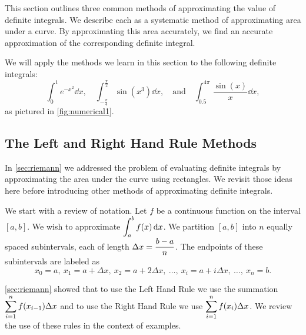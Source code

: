 This section outlines three common methods of approximating the value of definite integrals. We describe each as a systematic method of approximating area under a curve. By approximating this area accurately, we find an accurate approximation of the corresponding definite integral.

We will apply the methods we learn in this section to the following definite integrals:\vspace{-.5\baselineskip}
\[
 \int_0^1 e^{-x^2}\dd x, \quad
 \int_{-\frac{\pi}{4}}^{\frac{\pi}{2}} \sin(x^3)\dd x,
 \quad \text{and} \quad
 \int_{0.5}^{4\pi} \frac{\sin(x)}{x}\dd x,
\]
as pictured in \autoref{fig:numerical1}.

\subsection{The Left and Right Hand Rule Methods}

In \autoref{sec:riemann} we addressed the problem of evaluating definite integrals by approximating the area under the curve using rectangles. We revisit those ideas here before introducing other methods of approximating definite integrals. 

We start with a review of notation. Let $f$ be a continuous function on the interval $[a,b]$. We wish to approximate $\displaystyle \int_a^b f(x)\operatorname{d}\! x$. We partition $[a,b]$ into $n$ equally spaced subintervals, each of length $\displaystyle\Delta x = \frac{b-a}{n}$. The endpoints of these subintervals are labeled as
\[x_0=a,\ x_1 = a+\Delta x,\ x_2 = a+ 2\Delta x,\ \dotsc,\ x_i = a+i\Delta x,\ \dotsc,\ x_n = b.\]

\autoref{sec:riemann} showed that to use the Left Hand Rule we use the summation $\displaystyle \sum_{i=1}^n f(x_{i-1})\Delta x$ and to use the Right Hand Rule we use $\displaystyle \sum_{i=1}^n f(x_i)\Delta x$. We review the use of these rules in the context of examples.

